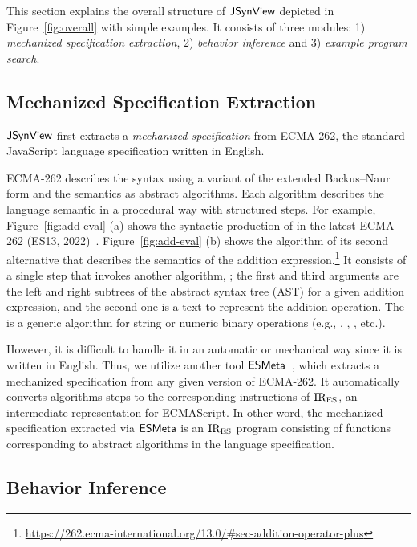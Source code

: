 This section explains the overall structure of $\tool$ depicted in
Figure~\ref{fig:overall} with simple examples.  It consists of three modules: 1)
\textit{mechanized specification extraction}, 2) \textit{behavior inference} and
3) \textit{example program search}.


\subsection{Mechanized Specification Extraction}\label{sec:extract-spec}

$\tool$ first extracts a \textit{mechanized specification} from ECMA-262, the
standard JavaScript language specification written in English.

ECMA-262 describes the syntax using a variant of the extended Backus–Naur form
and the semantics as abstract algorithms.  Each algorithm describes the language
semantic in a procedural way with structured steps.  For example,
Figure~\ref{fig:add-eval} (a) shows the syntactic production of
 in the latest ECMA-262 (ES13, 2022)~\cite{es13}.
Figure~\ref{fig:add-eval} (b) shows the  algorithm of its
second alternative that describes the semantics of the addition
expression.\footnote{\url{https://262.ecma-international.org/13.0/\#sec-addition-operator-plus}}
It consists of a single step that invokes another algorithm,
; the first and third arguments
are the left and right subtrees of the abstract syntax tree (AST) for a given
addition expression, and the second one is a text \code{+} to represent the
addition operation.  The  is a
generic algorithm for string or numeric binary operations (e.g., \code{-},
\code{*}, \code{<}, etc.).

However, it is difficult to handle it in an automatic or mechanical way since it
is written in English.  Thus, we utilize another tool $\esmeta$~\cite{jiset,
esmeta}, which extracts a mechanized specification from any given version of
ECMA-262.  It automatically converts algorithms steps to the corresponding
instructions of $\text{IR}_\text{ES}$, an intermediate representation for ECMAScript.  In
other word, the mechanized specification extracted via $\esmeta$ is an $\text{IR}_\text{ES}$
program consisting of functions corresponding to abstract algorithms in the
language specification.


\subsection{Behavior Inference}\label{sec:reduce-spec}

